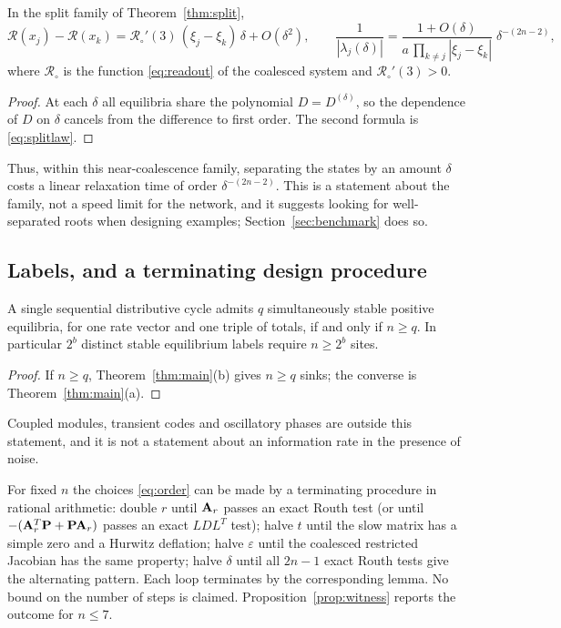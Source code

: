\begin{corollary}\label{cor:tradeoff}
In the split family of Theorem~\ref{thm:split},
\[
 \mathcal R(x_j)-\mathcal R(x_k)=\mathcal R_\circ'(3)\,(\xi_j-\xi_k)\,\delta+O(\delta^2),\qquad
 \frac{1}{|\lambda_j(\delta)|}=\frac{1+O(\delta)}{a\,\prod_{k\ne j}|\xi_j-\xi_k|}\;\delta^{-(2n-2)},
\]
where \(\mathcal R_\circ\) is the function \eqref{eq:readout} of the coalesced system and
\(\mathcal R_\circ'(3)>0\).
\end{corollary}
\begin{proof}
At each \(\delta\) all equilibria share the polynomial \(D=D^{(\delta)}\), so the dependence of
\(D\) on \(\delta\) cancels from the difference to first order. The second formula is
\eqref{eq:splitlaw}.
\end{proof}

Thus, within this near-coalescence family, separating the states by an amount \(\delta\) costs
a linear relaxation time of order \(\delta^{-(2n-2)}\). This is a statement about the family,
not a speed limit for the network, and it suggests looking for well-separated roots when
designing examples; Section~\ref{sec:benchmark} does so.

\subsection{Labels, and a terminating design procedure}
\begin{corollary}\label{cor:labels}
A single sequential distributive cycle admits \(q\) simultaneously stable positive equilibria,
for one rate vector and one triple of totals, if and only if \(n\ge q\). In particular
\(2^{b}\) distinct stable equilibrium labels require \(n\ge2^{b}\) sites.
\end{corollary}
\begin{proof}
If \(n\ge q\), Theorem~\ref{thm:main}(b) gives \(n\ge q\) sinks; the converse is
Theorem~\ref{thm:main}(a).
\end{proof}

Coupled modules, transient codes and oscillatory phases are outside this statement, and it is
not a statement about an information rate in the presence of noise.

\begin{remark}\label{rem:design}
For fixed \(n\) the choices \eqref{eq:order} can be made by a terminating procedure in rational
arithmetic: double \(r\) until \(\mathbf A_r\) passes an exact Routh test (or until
\(-(\mathbf A_r^{T}\mathbf P+\mathbf P\mathbf A_r)\) passes an exact \(LDL^{T}\) test); halve \(t\) until the slow
matrix has a simple zero and a Hurwitz deflation; halve \(\varepsilon\) until the coalesced
restricted Jacobian has the same property; halve \(\delta\) until all \(2n-1\) exact Routh
tests give the alternating pattern. Each loop terminates by the corresponding lemma. No bound
on the number of steps is claimed. Proposition~\ref{prop:witness} reports the outcome for
\(n\le7\).
\end{remark}

